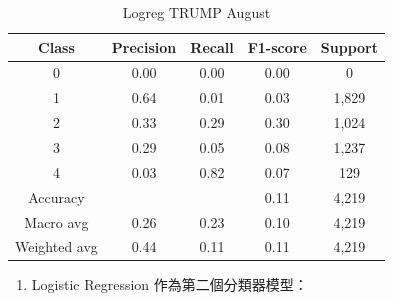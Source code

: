 \begin{enumerate}
\begin{table}[H]
        \vspace{1em} %
        
        \scriptsize
        \begin{tabular}{c|cccc}
        \hline
        Class & Precision & Recall & F1-score & Support \\
        \hline
        0 & 0.00 & 0.00 & 0.00 & 0 \\
        1 & 0.64 & 0.01 & 0.03 & 1,829 \\
        2 & 0.33 & 0.29 & 0.30 & 1,024 \\
        3 & 0.29 & 0.05 & 0.08 & 1,237 \\
        4 & 0.03 & 0.82 & 0.07 & 129 \\
        \hline
        Accuracy &       &      & 0.11 & 4,219 \\
        Macro avg & 0.26 & 0.23 & 0.10 & 4,219 \\
        Weighted avg & 0.44 & 0.11 & 0.11 & 4,219 \\
        \hline
        \end{tabular}
        \caption{Logreg TRUMP August}
        \label{tab:classifier_1_report_logreg_trump_filtered_aug}
        \end{table}

        \pagebreak

        \begin{enumerate}
            \item Logistic Regression 作為第二個分類器模型：


\end{enumerate}
\end{enumerate}
